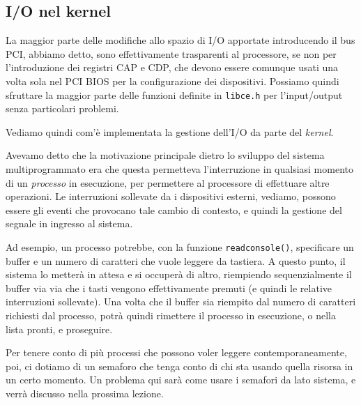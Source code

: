 \documentclass[a4paper,11pt]{article}
\begin{document}
\subsection{I/O nel kernel}
La maggior parte delle modifiche allo spazio di I/O apportate introducendo il bus PCI, abbiamo detto, sono effettivamente trasparenti al processore, se non per l'introduzione dei registri CAP e CDP, che devono essere comunque usati una volta sola nel PCI BIOS per la configurazione dei dispositivi.
Possiamo quindi sfruttare la maggior parte delle funzioni definite in \lstinline|libce.h| per l'input/output senza particolari problemi.

Vediamo quindi com'è implementata la gestione dell'I/O da parte del \textit{kernel}.

Avevamo detto che la motivazione principale dietro lo sviluppo del sistema multiprogrammato era che questa permetteva l'interruzione in qualsiasi momento di un \textit{processo} in esecuzione, per permettere al processore di effettuare altre operazioni.
Le interruzioni sollevate da i dispositivi esterni, vediamo, possono essere gli eventi che provocano tale cambio di contesto, e quindi la gestione del segnale in ingresso al sistema.

Ad esempio, un processo potrebbe, con la funzione \lstinline|readconsole()|, specificare un buffer e un numero di caratteri che vuole leggere da tastiera.
A questo punto, il sistema lo metterà in attesa e si occuperà di altro, riempiendo sequenzialmente il buffer via via che i tasti vengono effettivamente premuti (e quindi le relative interruzioni sollevate).
Una volta che il buffer sia riempito dal numero di caratteri richiesti dal processo, potrà quindi rimettere il processo in esecuzione, o nella lista pronti, e proseguire.

Per tenere conto di più processi che possono voler leggere contemporaneamente, poi, ci dotiamo di un semaforo che tenga conto di chi sta usando quella risorsa in un certo momento.
Un problema qui sarà come usare i semafori da lato sistema, e verrà discusso nella prossima lezione.
\end{document}
